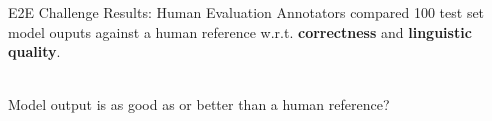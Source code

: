 \begin{frame}[t]{E2E Challenge Results: Human Evaluation}
    Annotators compared 100 test set model ouputs against a human
    reference w.r.t. \textbf{correctness} and \textbf{linguistic quality}.

    ~\\
    Model output is as good as or better than a human reference?\\

    ~\\





    
\end{frame}


